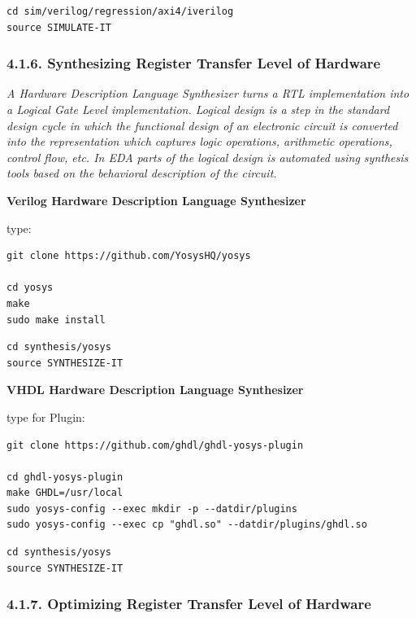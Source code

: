 \documentclass[
]{article}
\begin{document}
\begin{verbatim}
cd sim/verilog/regression/axi4/iverilog
source SIMULATE-IT
\end{verbatim}

\hypertarget{synthesizing-register-transfer-level-of-hardware}{%
\subsubsection{4.1.6. Synthesizing Register Transfer Level of
Hardware}\label{synthesizing-register-transfer-level-of-hardware}}

\emph{A Hardware Description Language Synthesizer turns a RTL
implementation into a Logical Gate Level implementation. Logical design
is a step in the standard design cycle in which the functional design of
an electronic circuit is converted into the representation which
captures logic operations, arithmetic operations, control flow, etc. In
EDA parts of the logical design is automated using synthesis tools based
on the behavioral description of the circuit.}

\textbf{Verilog Hardware Description Language Synthesizer}

type:

\begin{verbatim}
git clone https://github.com/YosysHQ/yosys

cd yosys
make
sudo make install
\end{verbatim}

\begin{verbatim}
cd synthesis/yosys
source SYNTHESIZE-IT
\end{verbatim}

\textbf{VHDL Hardware Description Language Synthesizer}

type for Plugin:

\begin{verbatim}
git clone https://github.com/ghdl/ghdl-yosys-plugin

cd ghdl-yosys-plugin
make GHDL=/usr/local
sudo yosys-config --exec mkdir -p --datdir/plugins
sudo yosys-config --exec cp "ghdl.so" --datdir/plugins/ghdl.so
\end{verbatim}

\begin{verbatim}
cd synthesis/yosys
source SYNTHESIZE-IT
\end{verbatim}

\hypertarget{optimizing-register-transfer-level-of-hardware}{%
\subsubsection{4.1.7. Optimizing Register Transfer Level of
Hardware}\label{optimizing-register-transfer-level-of-hardware}}
\end{document}
